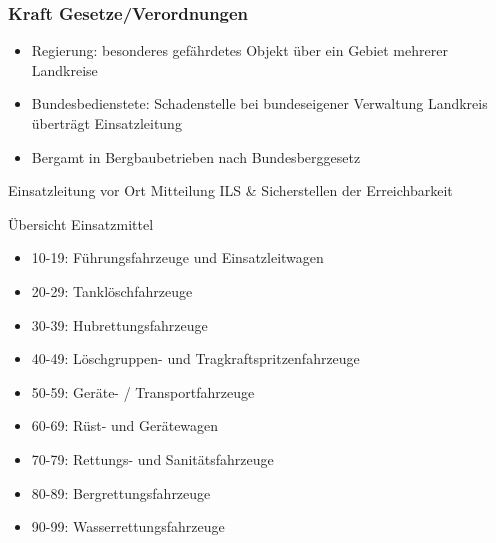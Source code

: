 \begin{normbox}{\subsubsection{Kraft Gesetze/Verordnungen}}
    \begin{itemize}
        \item Regierung: besonderes gefährdetes Objekt über ein Gebiet mehrerer Landkreise
        \item Bundesbedienstete: Schadenstelle bei bundeseigener Verwaltung \ra Landkreis überträgt Einsatzleitung 
        \item Bergamt in Bergbaubetrieben nach Bundesberggesetz
    \end{itemize}
\end{normbox}
\begin{warningbox}{Einsatzleitung vor Ort}
    Mitteilung ILS \& Sicherstellen der Erreichbarkeit
\end{warningbox}
\begin{hintbox}{Übersicht Einsatzmittel}
    \begin{itemize}
        \item 10-19: Führungsfahrzeuge und Einsatzleitwagen
        \item 20-29: Tanklöschfahrzeuge
        \item 30-39: Hubrettungsfahrzeuge
        \item 40-49: Löschgruppen- und Tragkraftspritzenfahrzeuge
        \item 50-59: Geräte- / Transportfahrzeuge
        \item 60-69: Rüst- und Gerätewagen
        \item 70-79: Rettungs- und Sanitätsfahrzeuge
        \item 80-89: Bergrettungsfahrzeuge
        \item 90-99: Wasserrettungsfahrzeuge
    \end{itemize}
\end{hintbox}
